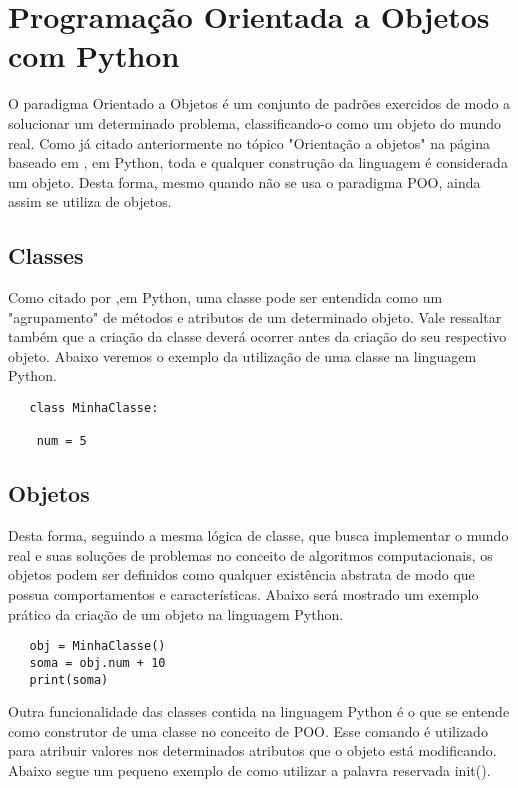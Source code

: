 

\chapter{ Programa\c{c}\~{a}o Orientada a Objetos com Python}
O paradigma Orientado a Objetos é um conjunto de padrões exercidos de modo a solucionar um determinado problema, classificando-o como um objeto do mundo real. Como já citado anteriormente no tópico "Orientação a objetos"  na página \pageref{ling2} baseado em \cite{FBarelli2019} , em Python, toda e qualquer construção da linguagem é considerada um objeto. Desta forma, mesmo quando não se usa o paradigma POO, ainda assim se utiliza de objetos.
    \section{Classes}
Como citado por \cite{Perkovic2016},em Python, uma classe pode ser entendida como um "agrupamento" de métodos e atributos de um determinado objeto. Vale ressaltar também que a criação da classe deverá ocorrer antes da criação do seu respectivo objeto. Abaixo veremos o exemplo da utilização de uma classe na linguagem Python.

   \begin{lstlisting}
   class MinhaClasse:
   
    num = 5

    \end{lstlisting}
\section{Objetos}
Desta forma, seguindo a mesma lógica de classe, que busca implementar o mundo real e suas soluções de problemas no conceito de algoritmos computacionais, os objetos podem ser definidos como qualquer existência abstrata de modo que possua comportamentos e características. Abaixo será mostrado um exemplo prático da criação de um objeto na linguagem Python.

   \begin{lstlisting}   	
   obj = MinhaClasse()
   soma = obj.num + 10
   print(soma)

\end{lstlisting}
Outra funcionalidade das classes contida na linguagem Python é o que se entende como construtor de uma classe no conceito de POO. Esse comando é utilizado para atribuir valores nos determinados atributos que o objeto está modificando. Abaixo segue um pequeno exemplo de como utilizar a palavra reservada init().

